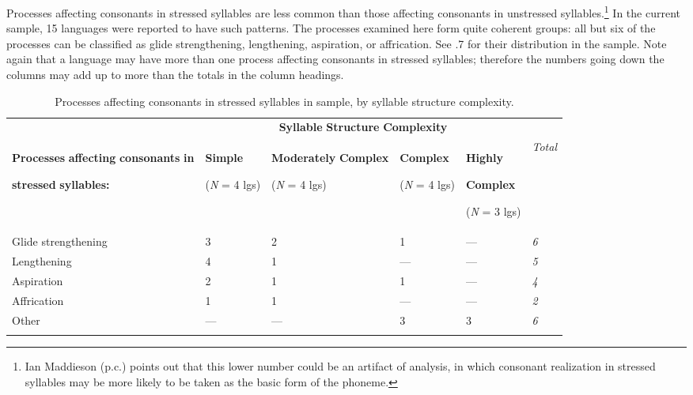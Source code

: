   Processes affecting consonants in stressed syllables are less common than those affecting consonants in unstressed syllables.\footnote{ \textrm{Ian Maddieson (p.c.) points out that this lower number could be an artifact of analysis, in which consonant realization in stressed syllables may be more likely to be taken as the basic form of the phoneme.}} In the current sample, 15 languages were reported to have such patterns. The processes examined here form quite coherent groups: all but six of the processes can be classified as glide strengthening, lengthening, aspiration, or affrication. See .7 for their distribution in the sample. Note again that a language may have more than one process affecting consonants in stressed syllables; therefore the numbers going down the columns may add up to more than the totals in the column headings.






\begin{table}
\begin{tabularx}{\textwidth}{XXXXXX}
\lsptoprule
 & \multicolumn{4}{c}{ \textbf{Syllable} \textbf{Structure} \textbf{Complexity}} & \\
{ \textbf{Processes} \textbf{affecting} \textbf{consonants} \textbf{in} }

 \textbf{stressed} \textbf{syllables:} & { \textbf{Simple}}

 (\textit{N} = 4 lgs) & { \textbf{Moderately} \textbf{Complex}}

 (\textit{N} = 4 lgs) & { \textbf{Complex}}

 (\textit{N} = 4 lgs) & { \textbf{Highly} }

{ \textbf{Complex}}

 (\textit{N} = 3 lgs) & \textit{Total}\\
 Glide strengthening & 3 & 2 & 1 & — & \textit{6}\\
 Lengthening & 4 & 1 & — & — & \textit{5}\\
 Aspiration & 2 & 1 & 1 & — & \textit{4}\\
 Affrication & 1 & 1 & — & — & \textit{2}\\
 Other & — & — & 3 & 3 & \textit{6}\\
\lspbottomrule
\end{tabularx}
\caption{\label{5.7}Processes affecting consonants in stressed syllables in sample, by syllable structure complexity.}
\end{table}




